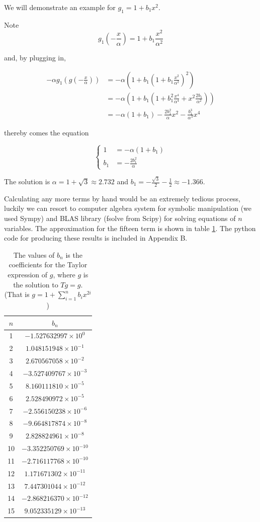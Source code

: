 We will demonstrate an example for $g_1 = 1 + b_1 x^2$. 

Note 
$$
g_1(-\frac{x}{\alpha}) = 1 + b_1 \frac{x^2}{\alpha ^2}
$$

and, by plugging in,

\begin{align*}
-\alpha g_1(g(-\frac{x}{\alpha})) 
&= -\alpha( 1 + b_1(1+b_1 \frac{x^2}{\alpha^2})^2) \\
&= -\alpha(1 + b_1(1 + b_1^2\frac{x^4}{\alpha^4} + x^2 \frac{2b_1}{\alpha^2})) \\
&= -\alpha (1 + b_1)  - \frac{2b_1^2}{\alpha} x^2 - \frac{b_1^3}{\alpha^3}x^4
\end{align*}

thereby comes the equation 

$$
\begin{cases}
    1 &= -\alpha(1+b_1) \\
    b_1 &= -\frac{2b_1^2}{\alpha} 
\end{cases}
$$

The solution is $\alpha = 1 + \sqrt{3} \approx 2.732$ and $b_1 = - \frac{\sqrt{3}}{2} - \frac{1}{2} \approx -1.366$.

Calculating any more terms by hand would be an extremely tedious process, luckily we can resort to computer algebra system for symbolic manipulation (we used Sympy) and BLAS library (fsolve from Scipy) for solving equations of $n$ variables. 
The approximation for the fifteen term is shown in table \ref{tb:b_i table}.
The python code for producing these results is included in Appendix B.

\begin{table}
\centering
\begin{tabular}{|c|c|}
\hline
$n$ & $b_n$ \\
\hline
1 & \( -1.527632997 \times 10^{0} \) \\
2 & \( 1.048151948 \times 10^{-1} \) \\
3 & \( 2.670567058 \times 10^{-2} \) \\
4 & \( -3.527409767 \times 10^{-3} \) \\
5 & \( 8.160111810 \times 10^{-5} \) \\
6 & \( 2.528490972 \times 10^{-5} \) \\
7 & \( -2.556150238 \times 10^{-6} \) \\
8 & \( -9.664817874 \times 10^{-8} \) \\
9 & \( 2.828824961 \times 10^{-8} \) \\
10 & \( -3.352250769 \times 10^{-10} \) \\
11 & \( -2.716117768 \times 10^{-10} \) \\
12 & \( 1.171671302 \times 10^{-11} \) \\
13 & \( 7.447301044 \times 10^{-12} \) \\
14 & \( -2.868216370 \times 10^{-12} \) \\
15 & \( 9.052335129 \times 10^{-13} \) \\
\hline
\end{tabular}
\caption{The values of $b_n$ is the coefficients for the Taylor expression of $g$, where $g$ is the solution to $Tg = g$.
(That is $g = 1 + \sum_{i=1}^n b_i x^{2i}$)}
\label{tb:b_i table}
\end{table}